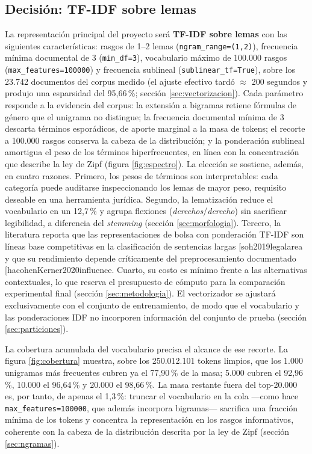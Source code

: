 \documentclass[11pt]{tg_usta}
\makeatletter
\renewcommand{\cite}{\@ifnextchar[{\@tempswatrue\@citex}{\@tempswafalse\@citex[]}}
\makeatother
\begin{document}
\subsection{Decisión: TF-IDF sobre lemas}
\label{sec:decision}
La representación principal del proyecto será \textbf{TF-IDF sobre lemas} con las siguientes características: rasgos de 1--2 lemas (\texttt{ngram\_range=(1,2)}), frecuencia mínima documental de 3 (\texttt{min\_df=3}), vocabulario máximo de 100.000 rasgos (\texttt{max\_features=100000}) y frecuencia sublineal (\texttt{sublinear\_tf=True}), sobre los 23.742 documentos del corpus medido (el ajuste efectivo tardó $\approx$ 200 segundos y produjo una esparsidad del 95,66\,\%; sección \ref{sec:vectorizacion}). Cada parámetro responde a la evidencia del corpus: la extensión a bigramas retiene fórmulas de género que el unigrama no distingue; la frecuencia documental mínima de 3 descarta términos esporádicos, de aporte marginal a la masa de tokens; el recorte a 100.000 rasgos conserva la cabeza de la distribución; y la ponderación sublineal amortigua el peso de los términos hiperfrecuentes, en línea con la concentración que describe la ley de Zipf (figura \ref{fig:espectro}). La elección se sostiene, además, en cuatro razones. Primero, los pesos de términos son interpretables: cada categoría puede auditarse inspeccionando los lemas de mayor peso, requisito deseable en una herramienta jurídica. Segundo, la lematización reduce el vocabulario en un 12,7\,\% y agrupa flexiones (\emph{derechos}/\emph{derecho}) sin sacrificar legibilidad, a diferencia del \emph{stemming} (sección \ref{sec:morfologia}). Tercero, la literatura reporta que las representaciones de bolsa con ponderación TF-IDF son líneas base competitivas en la clasificación de sentencias largas \cite{soh2019legalarea} y que su rendimiento depende críticamente del preprocesamiento documentado \cite{hacohenKerner2020influence}. Cuarto, su costo es mínimo frente a las alternativas contextuales, lo que reserva el presupuesto de cómputo para la comparación experimental final (sección \ref{sec:metodologia}). El vectorizador se ajustará exclusivamente con el conjunto de entrenamiento, de modo que el vocabulario y las ponderaciones IDF no incorporen información del conjunto de prueba (sección \ref{sec:particiones}).

La cobertura acumulada del vocabulario precisa el alcance de ese recorte. La figura \ref{fig:cobertura} muestra, sobre los 250.012.101 tokens limpios, que los 1.000 unigramas más frecuentes cubren ya el 77,90\,\% de la masa; 5.000 cubren el 92,96\,\%, 10.000 el 96,64\,\% y 20.000 el 98,66\,\%. La masa restante fuera del top-20.000 es, por tanto, de apenas el 1,3\,\%: truncar el vocabulario en la cola ---como hace \texttt{max\_features=100000}, que además incorpora bigramas--- sacrifica una fracción mínima de los tokens y concentra la representación en los rasgos informativos, coherente con la cabeza de la distribución descrita por la ley de Zipf (sección \ref{sec:ngramas}).
\end{document}
